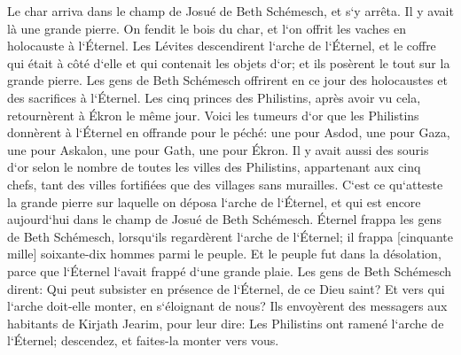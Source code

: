 \verse Le char arriva dans le champ de Josué de Beth Schémesch, et s`y arrêta. Il y avait là une grande pierre. On fendit le bois du char, et l`on offrit les vaches en holocauste à l`Éternel. 
\verse Les Lévites descendirent l`arche de l`Éternel, et le coffre qui était à côté d`elle et qui contenait les objets d`or; et ils posèrent le tout sur la grande pierre. Les gens de Beth Schémesch offrirent en ce jour des holocaustes et des sacrifices à l`Éternel. 
\verse Les cinq princes des Philistins, après avoir vu cela, retournèrent à Ékron le même jour. 
\verse Voici les tumeurs d`or que les Philistins donnèrent à l`Éternel en offrande pour le péché: une pour Asdod, une pour Gaza, une pour Askalon, une pour Gath, une pour Ékron. 
\verse Il y avait aussi des souris d`or selon le nombre de toutes les villes des Philistins, appartenant aux cinq chefs, tant des villes fortifiées que des villages sans murailles. C`est ce qu`atteste la grande pierre sur laquelle on déposa l`arche de l`Éternel, et qui est encore aujourd`hui dans le champ de Josué de Beth Schémesch. 
\verse Éternel frappa les gens de Beth Schémesch, lorsqu`ils regardèrent l`arche de l`Éternel; il frappa [cinquante mille] soixante-dix hommes parmi le peuple. Et le peuple fut dans la désolation, parce que l`Éternel l`avait frappé d`une grande plaie. 
\verse Les gens de Beth Schémesch dirent: Qui peut subsister en présence de l`Éternel, de ce Dieu saint? Et vers qui l`arche doit-elle monter, en s`éloignant de nous? 
\verse Ils envoyèrent des messagers aux habitants de Kirjath Jearim, pour leur dire: Les Philistins ont ramené l`arche de l`Éternel; descendez, et faites-la monter vers vous. 

